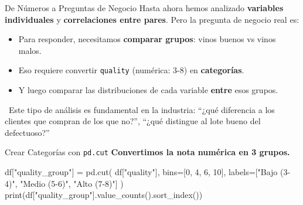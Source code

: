 \documentclass[aspectratio=169, 11pt]{beamer}
\begin{document}
\begin{frame}[shrink=5]{De Números a Preguntas de Negocio}
  \vspace{-4pt}
  {\footnotesize
    Hasta ahora hemos analizado \textbf{variables individuales} y \textbf{correlaciones entre pares}.
    Pero la pregunta de negocio real es:}

  \vspace{6pt}
  \begin{center}
  \end{center}

  \vspace{6pt}
  {\scriptsize
  \begin{itemize}\setlength{\itemsep}{4pt}
    \item[{\color{arcaRed}\scriptsize\faArrowRight}]
      Para responder, necesitamos \textbf{comparar grupos}: vinos buenos vs vinos malos.
    \item[{\color{arcaRed}\scriptsize\faArrowRight}]
      Eso requiere convertir \texttt{quality} (numérica: 3-8) en \textbf{categorías}.
    \item[{\color{arcaRed}\scriptsize\faArrowRight}]
      Y luego comparar las distribuciones de cada variable \textbf{entre} esos grupos.
  \end{itemize}
  }

  \vspace{4pt}
  {\scriptsize\color{textMuted}
    \faLightbulb\ Este tipo de análisis es fundamental en la industria:
    ``¿qué diferencia a los clientes que compran de los que no?'',
    ``¿qué distingue al lote bueno del defectuoso?''}
\end{frame}

\begin{frame}[fragile,shrink=28]{Crear Categorías con \texttt{pd.cut}}
  \vspace{-6pt}
  {\footnotesize\color{arcaDark}\bfseries
    Convertimos la nota numérica en 3 grupos.}

  \vspace{4pt}
  \begin{pyblock}
df["quality_group"] = pd.cut(
    df["quality"],
    bins=[0, 4, 6, 10],
    labels=["Bajo (3-4)", "Medio (5-6)", "Alto (7-8)"]
)
print(df["quality_group"].value_counts().sort_index())
  \end{pyblock}

  \vspace{4pt}
\end{frame}
\end{document}
